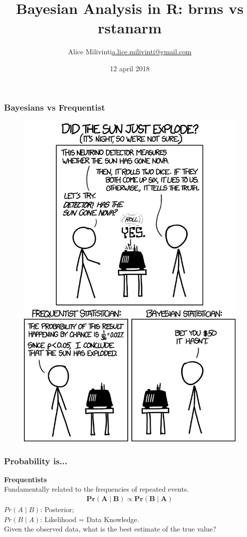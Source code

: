 \documentclass[handout]{beamer}\usepackage[]{graphicx}\usepackage[]{color}
\title{Bayesian Analysis in R: brms vs rstanarm}
\author{Alice Milivinti\newline\url{a.lice.milivinti@gmail.com}}}
\date{12 april 2018}
\begin{document}

\frame{\titlepage}

\begin{frame}
\frametitle{Bayesians vs Frequentist}
\begin{figure}
\centering
\includegraphics[scale=.3]{bayesians.png}
\end{figure}
\end{frame}


\begin{frame}
\frametitle{Probability is...}
\pause
{\Large \textbf{Frequentists}} \\
\vskip 1cm
\pause
Fundamentally related to the frequencies of repeated events. 
\pause
\begin{align*}
\mathbf{Pr(A \mid B) \propto Pr(B \mid A) }
\end{align*}
$Pr(A \mid B)$: Posterior; \\
$Pr(B \mid A)$: Likelihood = Data Knowledge. \\
\pause
Given the observed data, what is the best estimate of the true value?

\end{frame}
\end{document}
